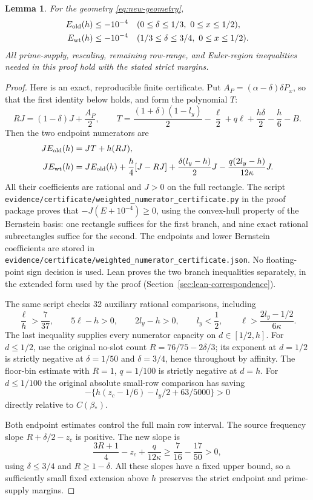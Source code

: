 \documentclass[11pt]{article}
\newtheorem{lemma}{Lemma}
\newcommand{\Bstar}{\beta_*}
\begin{document}
\begin{lemma}\label{lem:new-certificate}
For the geometry \eqref{eq:new-geometry},
\begin{align*}
 E_{\rm old}(h)&\le-10^{-4}
 &&(0\le\delta\le1/3,\ 0\le x\le1/2),\\
 E_{\rm wt}(h)&\le-10^{-4}
 &&(1/3\le\delta\le3/4,\ 0\le x\le1/2).
\end{align*}
All prime-supply, rescaling, remaining row-range, and Euler-region
inequalities needed in this proof hold with the stated strict margins.
\end{lemma}
\begin{proof}
Here is an exact, reproducible finite certificate. Put
$A_P=(\alpha-\delta)\delta P_x$, so that the first identity below holds,
and form the polynomial $T$:
\[
 RJ=(1-\delta)J+\frac{A_P}2,\qquad
 T=\frac{(1+\delta)(1-l_y)}2-\frac\ell2
       +q\ell+\frac{h\delta}{2}-\frac h6-B.
\]
Then the two endpoint numerators are
\begin{align*}
 J E_{\rm old}(h)&=JT+h(RJ),\\
 J E_{\rm wt}(h)&=J E_{\rm old}(h)
   +\frac h4[J-RJ]+\frac{\delta(l_y-h)}2J
   -\frac{q(2l_y-h)}{12\kappa}J.
\end{align*}
All their coefficients are rational and $J>0$ on the full rectangle.
The script
\nolinkurl{evidence/certificate/weighted_numerator_certificate.py} in the
proof package proves that $-J(E+10^{-4})\ge0$, using the convex-hull property
of the Bernstein basis: one rectangle suffices for the first branch,
and nine exact rational subrectangles suffice for the second.
The endpoints and lower Bernstein coefficients are stored in
\nolinkurl{evidence/certificate/weighted_numerator_certificate.json}.
No floating-point sign decision is used. Lean proves the two branch
inequalities separately, in the extended form used by the proof
(Section~\ref{sec:lean-correspondence}).

The same script checks 32 auxiliary rational comparisons, including
\[
 \frac\ell h>\frac7{37},\qquad 5\ell-h>0,\qquad
 2l_y-h>0,\qquad l_y<\frac12,
 \qquad \ell>\frac{2l_y-1/2}{6\kappa}.
\]
The last inequality supplies every numerator capacity on $d\in[1/2,h]$.
For $d\le1/2$, use the original no-slot count
$R=76/75-2\delta/3$; its exponent at $d=1/2$ is strictly negative
at $\delta=1/50$ and $\delta=3/4$, hence throughout by affinity.
The floor-bin estimate with $R=1$, $q=1/100$ is strictly negative
at $d=h$.
For $d\le1/100$ the original absolute small-row comparison has saving
\[
 -\{h(z_c-1/6)-l_y/2+63/5000\}>0
\]
directly relative to $C(\Bstar)$.

Both endpoint estimates control the full main row interval. The source
frequency slope $R+\delta/2-z_c$ is positive. The new slope is
\[
 \frac{3R+1}{4}-z_c+\frac q{12\kappa}
 \ge \frac{7}{16}-\frac{17}{50}>0,
\]
using $\delta\le3/4$ and $R\ge1-\delta$. All these slopes have a
fixed upper bound, so a sufficiently small fixed extension above $h$
preserves the strict endpoint and prime-supply margins.
\end{proof}
\end{document}

